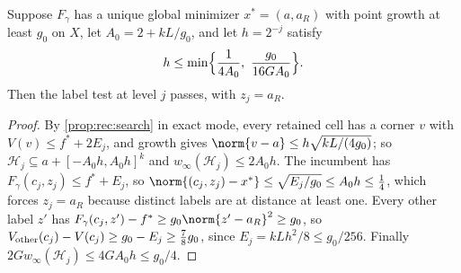 \begin{lemma}\label{lem:int:native-stop}
Suppose $F_\gamma$ has a unique global minimizer $x^*=(a,a_R)$ with point growth
at least $g_0$ on $X$, let $A_0=2+kL/g_0$, and let $h=2^{-j}$ satisfy
\[
 h\le\min\Bigl\{\frac1{4A_0},\ \frac{g_0}{16GA_0}\Bigr\}.
\]
Then the label test at level $j$ passes, with $z_j=a_R$.
\end{lemma}

\begin{proof}
By \cref{prop:rec:search} in exact mode, every retained cell has a corner $v$
with $V(v)\le f^*+2E_j$, and growth gives $\norm{v-a}\le h\sqrt{kL/(4g_0)}$; so
$\mathcal H_j\subseteq a+[-A_0h,A_0h]^k$ and $w_\infty(\mathcal H_j)\le2A_0h$. The
incumbent has $F_\gamma(c_j,z_j)\le f^*+E_j$, so
$\norm{(c_j,z_j)-x^*}\le\sqrt{E_j/g_0}\le A_0h\le\frac14$, which forces
$z_j=a_R$ because distinct labels are at distance at least one. Every other
label $z'$ has $F_\gamma(c_j,z')-f^*\ge g_0\norm{z'-a_R}^2\ge g_0$, so
$V_{\rm other}(c_j)-V(c_j)\ge g_0-E_j\ge\frac78g_0$, since
$E_j=kLh^2/8\le g_0/256$. Finally $2Gw_\infty(\mathcal H_j)\le4GA_0h\le g_0/4$.
\end{proof}

